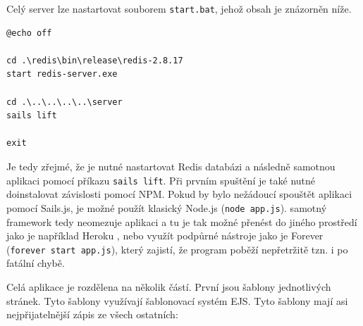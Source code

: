 \begin{figure}[H]
\end{figure}

Celý server lze nastartovat souborem \texttt{start.bat}, jehož obsah je znázorněn níže.

\begin{verbatim}
@echo off

cd .\redis\bin\release\redis-2.8.17
start redis-server.exe

cd .\..\..\..\..\server
sails lift

exit
\end{verbatim}

Je tedy zřejmé, že je nutné nastartovat Redis databázi a následně samotnou aplikaci pomocí příkazu \texttt{sails lift}. Při prvním spuštění je také nutné doinstalovat závislosti pomocí NPM. Pokud by bylo nežádoucí spouštět aplikaci pomocí Sails.js, je možné použít klasický Node.js (\texttt{node app.js}). samotný framework tedy neomezuje aplikaci a tu je tak možné přenést do jiného prostředí jako je například Heroku \cite{heroku}, nebo využít podpůrné nástroje jako je Forever \cite{forever} (\texttt{forever start app.js}), který zajistí, že program poběží nepřetržitě tzn. i po fatální chybě.

Celá aplikace je rozdělena na několik částí. První jsou šablony jednotlivých stránek. Tyto šablony využívají šablonovací systém EJS. Tyto šablony mají asi nejpřijatelnější zápis ze všech ostatních:

